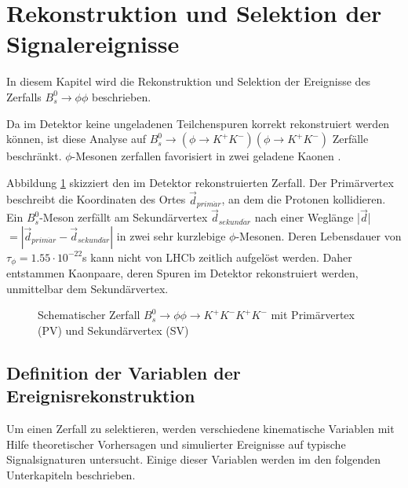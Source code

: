 \documentclass{article}
\begin{document}
\newpage
\section{Rekonstruktion und Selektion der Signalereignisse}
In diesem Kapitel wird die Rekonstruktion und Selektion der Ereignisse des Zerfalls $B_s^0 \rightarrow \phi \phi$ beschrieben. 

Da im Detektor keine ungeladenen Teilchenspuren korrekt rekonstruiert werden können, ist diese Analyse auf $B_s^0 \rightarrow (\phi\rightarrow K^+K^-) (\phi\rightarrow K^+K^-)$ Zerfälle beschränkt. $\phi$-Mesonen zerfallen favorisiert in zwei geladene Kaonen \cite{PDG}.  %


Abbildung \ref{fig:schema2} skizziert den im Detektor rekonstruierten Zerfall. Der Primärvertex beschreibt die Koordinaten des Ortes $\vec{d}_{prim\ddot{a}r}$, an dem die Protonen kollidieren. Ein $B_s^0$-Meson zerfällt am Sekundärvertex $\vec{d}_{sekund\ddot{a}r}$ nach einer Weglänge |$\vec{d}$|$=|\vec{d}_{prim\ddot{a}r}-\vec{d}_{sekund\ddot{a}r}|$ in zwei sehr kurzlebige $\phi$-Mesonen. Deren Lebensdauer von $\tau_{\phi}=1.55 \cdot 10^{-22}$s \cite{PDG} kann nicht von LHCb zeitlich aufgelöst werden. Daher entstammen Kaonpaare, deren Spuren im Detektor rekonstruiert werden, unmittelbar dem Sekundärvertex.  %
\begin{figure}[h!]
\centering
 \caption{Schematischer Zerfall $B_s^0 \rightarrow \phi \phi \rightarrow K^+K^-K^+K^-$ mit Primärvertex (PV) und Sekundärvertex (SV)}
\label{fig:schema2}
\end{figure}  


\subsection{Definition der Variablen der Ereignisrekonstruktion}
Um einen Zerfall zu selektieren, werden verschiedene kinematische Variablen mit Hilfe theoretischer Vorhersagen und simulierter Ereignisse auf typische Signalsignaturen untersucht. Einige dieser Variablen werden im den folgenden Unterkapiteln beschrieben.
\end{document}
